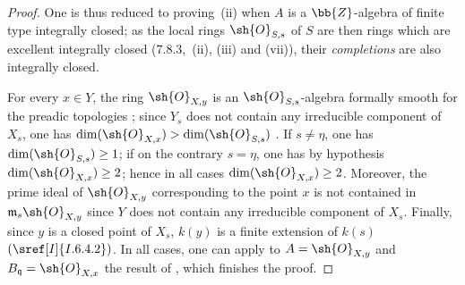 \begin{proof}
One is thus reduced to proving~(ii) when $A$ is a $\bb{Z}$-algebra of finite type integrally closed; as the local rings $\sh{O}_{S,s}$ of $S$ are then rings which are excellent integrally closed (7.8.3,~(ii), (iii) and (vii)), their \emph{completions} are also integrally closed.

For every $x\in Y$, the ring $\sh{O}_{X,y}$ is an $\sh{O}_{S,s}$-algebra formally smooth for the preadic topologies ; since $Y_s$ does not contain any irreducible component of $X_s$, one has $\dim(\sh{O}_{X,x})>\dim(\sh{O}_{S,s})$ .
If $s\neq\eta$, one has $\dim(\sh{O}_{S,s})\geq 1$; if on the contrary $s=\eta$, one has by hypothesis $\dim(\sh{O}_{X,x})\geq 2$; hence in all cases $\dim(\sh{O}_{X,x})\geq 2$.
Moreover, the prime ideal of $\sh{O}_{X,y}$ corresponding to the point $x$ is not contained in $\mathfrak{m}_s\sh{O}_{X,y}$ since $Y$ does not contain any irreducible component of $X_s$.
Finally, since $y$ is a closed point of $X_s$, $k(y)$ is a finite extension of $k(s)$ $(\sref[I]{I.6.4.2})$.
In all cases, one can apply to $A=\sh{O}_{X,y}$ and $B_\mathfrak{q}=\sh{O}_{X,x}$ the result of , which finishes the proof.
\end{proof}

